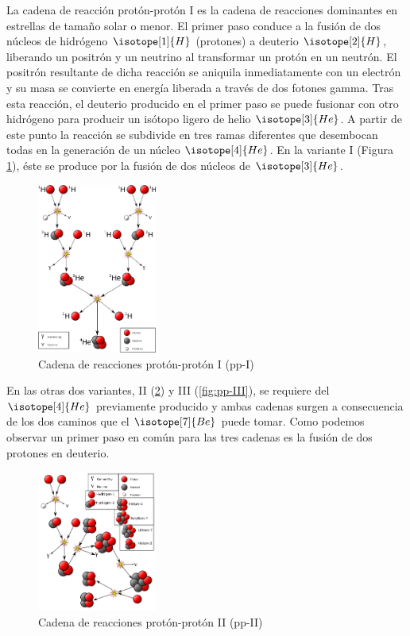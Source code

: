La cadena de reacción protón-protón I es la cadena de reacciones dominantes en estrellas de tamaño solar o menor. El primer paso conduce a la fusión de dos núcleos de hidrógeno $\isotope[1]{H}$ (protones) a deuterio $\isotope[2]{H}$, liberando un positrón y un neutrino al transformar un protón en un neutrón. El positrón resultante de dicha reacción se aniquila inmediatamente con un electrón y su masa se convierte en energía liberada a través de dos fotones gamma. Tras esta reacción, el deuterio producido en el primer paso se puede fusionar con otro hidrógeno para producir un isótopo ligero de helio $\isotope[3]{He}$. A partir de este punto la reacción se subdivide en tres ramas diferentes que desembocan todas en la generación de un núcleo $\isotope[4]{He}$. En la variante I (Figura \ref{fig:pp-I}), éste se produce por la fusión de dos núcleos de $\isotope[3]{He}$.\par


\begin{figure}
	\centering
	\includegraphics[width=0.35\textwidth]{img/tesis/pp-I.png}
	\caption {Cadena de reacciones protón-protón I (pp-I)}
	\label{fig:pp-I}
\end{figure}

En las otras dos variantes, II (\ref{fig:pp-II}) y III (\ref{fig:pp-III}), se requiere del $\isotope[4]{He}$ previamente producido y ambas cadenas surgen a consecuencia de los dos caminos que el $\isotope[7]{Be}$ puede tomar. Como podemos observar un primer paso en común para las tres cadenas es la fusión de dos protones en deuterio.

\begin{figure}
	\centering
	\includegraphics[width=0.35\textwidth]{img/tesis/pp-II.png}
	\caption {Cadena de reacciones protón-protón II (pp-II)}
	\label{fig:pp-II}
\end{figure}

